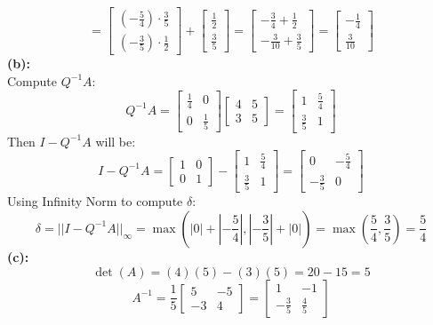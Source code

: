 \documentclass{article}
\begin{document}
\[
    = \begin{bmatrix} (-\frac{5}{4}) \cdot \frac{3}{5} \\ (-\frac{3}{5}) \cdot \frac{1}{2} \end{bmatrix} + \begin{bmatrix} \frac{1}{2} \\ \frac{3}{5} \end{bmatrix} 
    = \begin{bmatrix} -\frac{3}{4} + \frac{1}{2} \\ -\frac{3}{10} + \frac{3}{5} \end{bmatrix}
    = \begin{bmatrix} -\frac{1}{4} \\ \frac{3}{10} \end{bmatrix} 
\]
\textbf{(b): }
\\
Compute \( Q^{-1}A \):
\[ Q^{-1}A = \begin{bmatrix} \frac{1}{4} & 0 \\ 0 & \frac{1}{5} \end{bmatrix} \begin{bmatrix} 4 & 5 \\ 3 & 5 \end{bmatrix} = \begin{bmatrix} 1 & \frac{5}{4} \\ \frac{3}{5} & 1 \end{bmatrix} \]
Then \( I - Q^{-1}A \) will be:
\[ I - Q^{-1}A = \begin{bmatrix} 1 & 0 \\ 0 & 1 \end{bmatrix} - \begin{bmatrix} 1 & \frac{5}{4} \\ \frac{3}{5} & 1 \end{bmatrix} = \begin{bmatrix} 0 & -\frac{5}{4} \\ -\frac{3}{5} & 0 \end{bmatrix} \]
Using Infinity Norm to compute $\delta$:
\[ \delta = || I - Q^{-1}A ||_{\infty} = \max \left( |0| + |-\frac{5}{4}|, |-\frac{3}{5}| + |0| \right) = \max \left( \frac{5}{4}, \frac{3}{5} \right) = \frac{5}{4} \]
\textbf{(c): }
\\
\[ \det(A) = (4)(5) - (3)(5) = 20 - 15 = 5 \]
\[ A^{-1} = \frac{1}{5} \begin{bmatrix} 5 & -5 \\ -3 & 4 \end{bmatrix} = \begin{bmatrix} 1 & -1 \\ -\frac{3}{5} & \frac{4}{5} \end{bmatrix} \]
\end{document}

